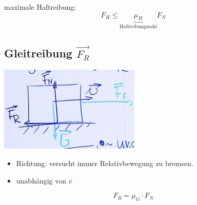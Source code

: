 maximale Haftreibung:
\[ F_H \leq \underbrace{\mu_H}_{\text{Haftreibungszahl}} F_N \]

\subsection{Gleitreibung \texorpdfstring{$\vec{F_R}$}{F_R}}
\includegraphics{Bild29}
\begin{itemize}
	\item Richtung: versucht immer Relativbewegung zu bremsen.
	\item unabhängig von $v$
\end{itemize}
\[ F_R = \mu_G \cdot F_N \]

